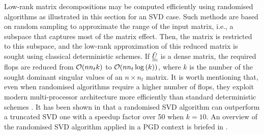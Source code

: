 Low-rank matrix decompositions may be computed efficiently using randomised algorithms as illustrated in this section for an SVD case. Such methods are based on random sampling to approximate the range of the input matrix, i.e., a subspace that captures most of the matrix effect. Then, the matrix is restricted to this subspace, and the low-rank approximation of this reduced matrix is sought using classical deterministic schemes. If ${\tilde{\underline{\underline{U}}}}$ is a dense matrix, the required flops are reduced from ${\cal O}(nn_tk)$ to ${\cal O}(nn_t\log{(k)})$, where $k$ is the number of the sought dominant singular values of an $n\times n_t$ matrix. It is worth mentioning that, even when randomised algorithms require a higher number of flops, they exploit modern multi-processor architecture more efficiently than standard deterministic schemes \parencite{halko2011finding}. {It has been shown in \parencite{Bach_Ceglia_2018} that a randomised SVD algorithm can outperform a truncated SVD one with a speedup factor over 50 when $k=10$.} An overview of the randomised SVD algorithm applied in a PGD context is briefed in .

